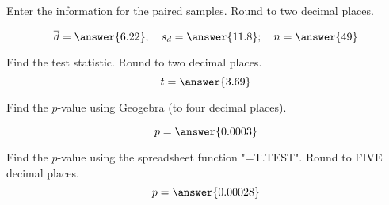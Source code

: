 \documentclass{ximera}
\begin{document}
\begin{problem}\label{prob:140lab3prob2}
Enter the information for the paired samples.  Round to two decimal places.

$$\overline{d}=\answer{6.22};\quad s_d=\answer{11.8};\quad n=\answer{49}$$

Find the test statistic.  Round to two decimal places.
$$t=\answer{3.69}$$

Find the $p$-value using Geogebra (to four decimal places).

\begin{center}  
\end{center}

$$p=\answer{0.0003}$$

Find the $p$-value using the spreadsheet function "=T.TEST".  Round to FIVE decimal places.
$$p=\answer{0.00028}$$
\end{problem}
\end{document}
